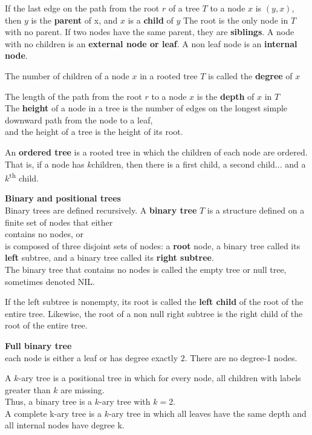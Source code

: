 \documentclass{article}
\begin{document}
If the last edge on the path from the root $r$ of a tree $T$ to a node $x$ is $(y, x)$, then $y$ is the \textbf{parent} of x, and $x$ is a \textbf{child} of $y$ The root is the only node in $T$ with no parent. If two nodes have the same parent, they are \textbf{siblings}. A node with no children is an \textbf{external node or leaf}. A non leaf node is an \textbf{internal node}.

\bigskip
The number of children of a node $x$ in a rooted tree $T$ is called the \textbf{degree} of $x$

The length of the path from the root $r$ to a node $x$ is the \textbf{depth} of $x$ in $T$ \\
The \textbf{height} of a node in a tree is the number of edges on the longest simple downward path from the node to a leaf, \\
and the height of a tree is the height of its root.

\bigskip
An \textbf{ordered tree} is a rooted tree in which the children of each node are ordered. That is, if a node has $k$children, then there is a first child, a second child... and a $k$\textsuperscript{th} child.

\bigskip
\textbf{Binary and positional trees}\\
Binary trees are defined recursively. A \textbf{binary tree} $T$ is a structure defined on a finite set of nodes that either\\
\indent contains no nodes, or\\
\indent is composed of three disjoint sets of nodes: a \textbf{root} node, a binary tree called its \textbf{left} subtree, and a binary tree called its \textbf{right subtree}.\\

The binary tree that contains no nodes is called the empty tree or null tree, sometimes denoted NIL.

If the left subtree is nonempty, its root is called the \textbf{left child} of the root of the entire tree. Likewise, the root of a non null right subtree is the right child of the root of the entire tree.

\bigskip
\textbf{Full binary tree}\\
each node is either a leaf or has degree exactly $2$. There are no degree-1 nodes.

A $k$-ary tree is a positional tree in which for every node, all children with labels greater than $k$ are missing. \\
Thus, a binary tree is a $k$-ary tree with $k = 2$.\\
A complete k-ary tree is a $k$-ary tree in which all leaves have the same depth and all internal nodes have degree k.
\end{document}
